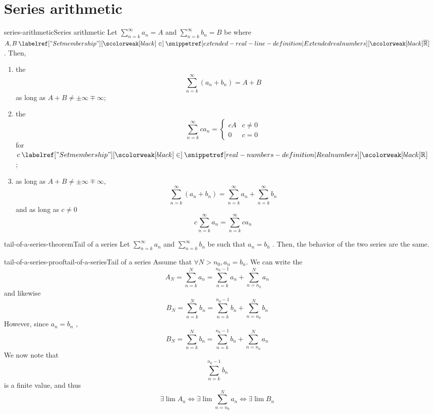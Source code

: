 \documentclass[preview]{standalone}
\begin{document}
\section{Series arithmetic}

\begin{snippetproposition}{series-arithmetic}{Series arithmetic}
    Let \(\sum_{n=k}^\infty a_n = A\) and \(\sum_{n=k}^\infty b_n = B\) be \series
    where \(A,B\in\extendedrealnumbers\). Then,
    \begin{enumerate}
        \item the \series \[ \sum_{n=k}^\infty \left(a_n+b_n\right) = A+B \]
        as long as \(A+B\neq \pm\infty \mp\infty\);
        \item the \series \[ \sum_{n=k}^\infty ca_n = \begin{cases} cA & c\neq 0 \\ 0 & c=0 \end{cases} \]
            for \(c\in\realnumbers\);
        \item as long as \(A+B\neq \pm\infty \mp\infty\),
            \[
                \sum_{n=k}^\infty (a_n+b_n) = \sum_{n=k}^\infty a_n + \sum_{n=k}^\infty b_n
            \]
            and as long as \(c\neq 0\)
            \[
                c\sum_{n=k}^\infty a_n = \sum_{n=k}^\infty ca_n
            \]
    \end{enumerate}
\end{snippetproposition}

\begin{snippettheorem}{tail-of-a-series-theorem}{Tail of a series}
    Let \(\sum_{n=k}^\infty a_n\) and \(\sum_{n=k}^\infty b_n\) be \series
    such that \(a_n = b_h\) \eventually.
    Then, the behavior of the two series are the same.
\end{snippettheorem}


\begin{snippetproof}{tail-of-a-series-proof}{tail-of-a-series}{Tail of a series}
    Assume that \(\forall N>n_0, a_n = b_n\).
    We can write the \partialsum
    \[
        A_N = \sum_{n=k}^N a_n = \sum_{n=k}^{n_0 - 1}a_n
        + \sum_{n=n_0}^N a_n
    \]
    and likewise
    \[
        B_N = \sum_{n=k}^N b_n = \sum_{n=k}^{n_0 - 1}b_n
        + \sum_{n=n_0}^N b_n
    \]
    However, since \(a_n = b_n\) \eventually,
    \[
        B_N = \sum_{n=k}^N b_n = \sum_{n=k}^{n_0 - 1}b_n
        + \sum_{n=n_0}^N a_n
    \]
    We now note that
    \[ \sum_{n=k}^{n_0 - 1}b_n \]
    is a finite value, and thus
    \[
        \exists \lim A_n
        \iff
        \exists \lim \sum_{n=n_0}^N a_n
        \iff
        \exists \lim B_n
    \]
\end{snippetproof}
\end{document}
